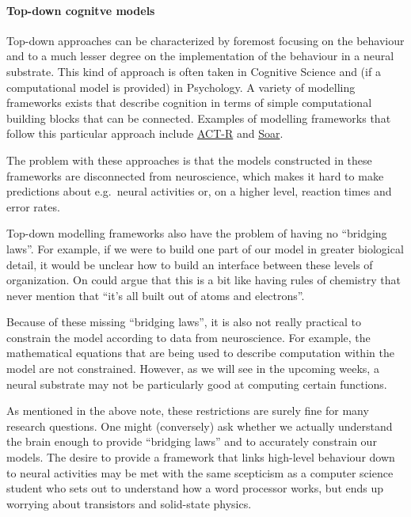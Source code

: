 \documentclass[10pt,letterpaper,oneside]{article}
\begin{document}
\paragraph{Top-down cognitve models}
Top-down approaches can be characterized by foremost focusing on the behaviour and to a much lesser degree on the implementation of the behaviour in a neural substrate. This kind of approach is often taken in Cognitive Science and (if a computational model is provided) in Psychology. A variety of modelling frameworks exists that describe cognition in terms of simple computational building blocks that can be connected. Examples of modelling frameworks that follow this particular approach include \href{http://act-r.psy.cmu.edu/}{ACT-R} and \href{https://soar.eecs.umich.edu/}{Soar}.

The problem with these approaches is that the models constructed in these frameworks are disconnected from neuroscience, which makes it hard to make predictions about e.g.~neural activities or, on a higher level, reaction times and error rates.

Top-down modelling frameworks also have the problem of having no \enquote{bridging laws}. For example, if we were to build one part of our model in greater biological detail, it would be unclear how to build an interface between these levels of organization. On could argue that this is a bit like having rules of chemistry that never mention that \enquote{it's all built out of atoms and electrons}.

Because of these missing \enquote{bridging laws}, it is also not really practical to constrain the model according to data from neuroscience. For example, the mathematical equations that are being used to describe computation within the model are not constrained. However, as we will see in the upcoming weeks, a neural substrate may not be particularly good at computing certain functions.

As mentioned in the above note, these restrictions are surely fine for many research questions. One might (conversely) ask whether we actually understand the brain enough to provide \enquote{bridging laws} and to accurately constrain our models. The desire to provide a framework that links high-level behaviour down to neural activities may be met with the same scepticism as a computer science student who sets out to understand how a word processor works, but ends up worrying about transistors and solid-state physics.

\end{document}
